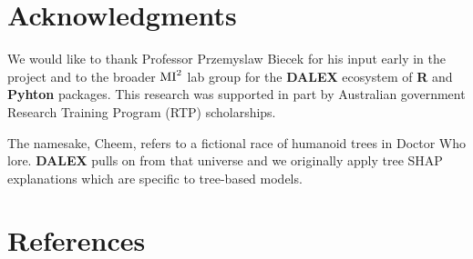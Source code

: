\documentclass[
]{article}
\begin{document}
\hypertarget{acknowledgments}{%
\section{Acknowledgments}\label{acknowledgments}}

We would like to thank Professor Przemyslaw Biecek for his input early in the project and to the broader \(\text{MI}^\text2\) lab group for the \textbf{DALEX} ecosystem of \textbf{R} and \textbf{Pyhton} packages. This research was supported in part by Australian government Research Training Program (RTP) scholarships.

The namesake, Cheem, refers to a fictional race of humanoid trees in Doctor Who lore. \textbf{DALEX} pulls on from that universe and we originally apply tree SHAP explanations which are specific to tree-based models.

\hypertarget{references}{%
\section*{References}\label{references}}
\end{document}
